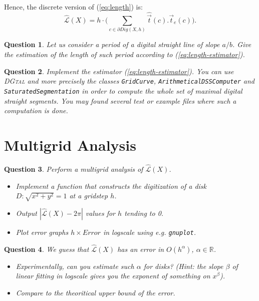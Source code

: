 \documentclass[a4paper, 11pt]{article}
\newtheorem{qu}{Question}
\begin{document}
Hence, the discrete version of (\ref{eq:length}) is:
\begin{equation}
\label{eq:length-estimator}
\hat{\mathcal{L}}(X) = h \cdot \Big( \sum_{c \in \partial Dig(X,h)}  \hat{\vec{t}}(c) . \vec{t}_{e}(c) \Big). 
\end{equation}

\begin{qu}
 Let us consider a period of a digital straight line of slope $a/b$. 
Give the estimation of the length of such period according to (\ref{eq:length-estimator}). 
\end{qu}

\begin{qu}
Implement the estimator (\ref{eq:length-estimator}). You can use \textsc{DGtal} and 
more precisely the classes {\tt GridCurve}, {\tt ArithmeticalDSSComputer} and 
{\tt SaturatedSegmentation} in order to compute the whole set of maximal digital straight 
segments. You may found several test or example files where such a computation is done. 
\end{qu}

\section{Multigrid Analysis}


\begin{qu}
  Perform a multigrid analysis of $\hat{\mathcal{L}}(X)$. 
  \begin{itemize}
  \item Implement a function that constructs the digitization of a disk 
$D: \sqrt{x^2 + y^2} = 1$ at a gridstep $h$.  
  \item Output $| \hat{\mathcal{L}}(X) - 2\pi |$ values for $h$ tending to 0.
  \item Plot error graphs $h \times Error$ in logscale using e.g. \texttt{gnuplot}.
  \end{itemize}	 
\end{qu}	

\begin{qu} 
We guess that $\hat{\mathcal{L}}(X)$ has an error in $O(h^{\alpha})$, $\alpha \in \mathbb{R}$. 
\begin{itemize}
\item Experimentally, can you estimate such $\alpha$ for disks? (Hint: the slope $\beta$ of 
linear fitting in logscale gives you the exponent of something on $x^\beta$). 
\item Compare to the theoritical upper bound of the error. 
\end{itemize}
\end{qu}	
\end{document}

